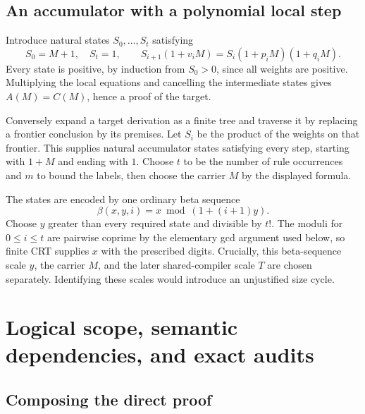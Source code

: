 \documentclass[11pt,letterpaper]{article}
\begin{document}
\subsection{An accumulator with a polynomial local step}

Introduce natural states $S_0,\ldots,S_t$ satisfying
\[
 S_0=M+1,\quad S_t=1,\qquad
 S_{i+1}(1+v_iM)=S_i(1+p_iM)(1+q_iM).
\]
Every state is positive, by induction from $S_0>0$, since all weights
are positive. Multiplying the local equations and cancelling the
intermediate states gives $A(M)=C(M)$, hence a proof of the target.

Conversely expand a target derivation as a finite tree and traverse it
by replacing a frontier conclusion by its premises. Let $S_i$ be the
product of the weights on that frontier. This supplies natural accumulator
states satisfying every step, starting with $1+M$ and ending with $1$.
Choose $t$ to be the number of rule occurrences and $m$ to bound the labels,
then choose the carrier $M$ by the displayed formula.

The states are encoded by one ordinary beta sequence
\[
 \beta(x,y,i)=x\bmod(1+(i+1)y).
\]
Choose $y$ greater than every required state and divisible by $t!$.
The moduli for $0\le i\le t$ are pairwise coprime by the elementary
gcd argument used below, so finite CRT supplies $x$ with the prescribed
digits. Crucially, this beta-sequence scale $y$, the carrier $M$, and
the later shared-compiler scale $T$ are chosen separately. Identifying
these scales would introduce an unjustified size cycle.





\section{Logical scope, semantic dependencies, and exact audits}
\label{sec:scope}

\subsection{Composing the direct proof}
\end{document}

